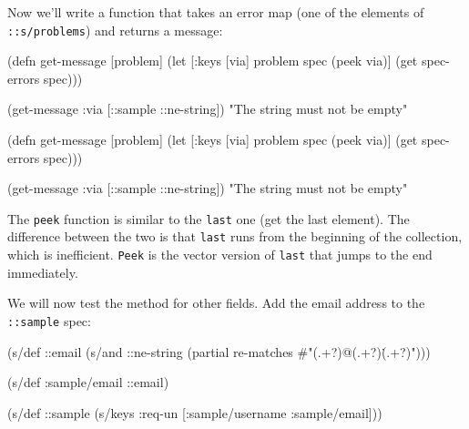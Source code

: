 \fi

Now we'll write a function that takes an error map (one of the elements of \verb|::s/problems|) and returns a message:


\ifx\DEVICETYPE\MOBILE

  \begin{clojure}
(defn get-message [problem]
  (let [{:keys [via]} problem
        spec (peek via)]
    (get spec-errors spec)))

(get-message {:via [::sample
                    ::ne-string]})
"The string must not be empty"
  \end{clojure}

\else

  \begin{clojure}
(defn get-message [problem]
  (let [{:keys [via]} problem
        spec (peek via)]
    (get spec-errors spec)))

(get-message {:via [::sample ::ne-string]})
"The string must not be empty"
  \end{clojure}

\fi

The \verb|peek| function is similar to the \verb|last| one (get the last element). The difference between the two is that \verb|last| runs from the beginning of the collection, which is inefficient. \verb|Peek| is the vector version of \verb|last| that jumps to the end immediately.

We will now test the method for other fields. Add the email address to the \verb|::sample| spec:


\ifx\DEVICETYPE\MOBILE

\begin{english}
  \begin{clojure}
(s/def ::email
  (s/and
    ::ne-string
    (partial re-matches
      #"(.+?)@(.+?)\.(.+?)")))

(s/def :sample/email ::email)

(s/def ::sample
  (s/keys :req-un [:sample/username
                   :sample/email]))
  \end{clojure}
\end{english}

